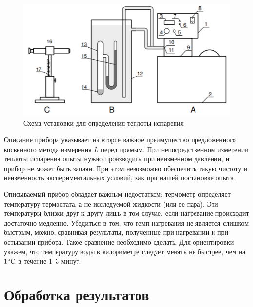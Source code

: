 \documentclass[a4paper,12pt]{article} %
\theoremstyle{plain} %
\theoremstyle{definition} %
\theoremstyle{remark} %
\begin{document}
\begin{figure}[H]
	\centering
	\includegraphics[scale=1]{im2}
	\caption{Схема установки для определения теплоты испарения}
\end{figure}

Описание прибора указывает на второе важное преимущество
предложенного косвенного метода измерения $L$ перед прямым. При
непосредственном измерении теплоты испарения опыты нужно производить при неизменном давлении,
и прибор не может быть запаян. При этом невозможно обеспечить такую чистоту
и неизменность экспериментальных условий,
как при нашей постановке опыта.

Описываемый прибор обладает важным недостатком: термометр
определяет температуру термостата,
а не исследуемой жидкости (или ее пара). Эти температуры близки друг
к другу лишь в том случае, если нагревание происходит достаточно медленно. Убедиться в том,
что темп нагревания не является слишком быстрым, можно, сравнивая результаты, полученные при нагревании
и при остывании прибора. Такое сравнение необходимо сделать. Для ориентировки укажем,
что температуру воды в калориметре следует менять не быстрее, чем
на $\rm 1^{\circ}C$ в течение 1–3 минут.

\section*{Обработка результатов}
\end{document}
